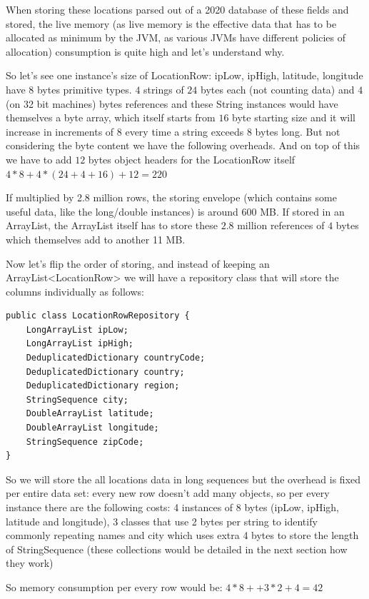 \documentclass[a4paper,twoside]{article}
\begin{document}
When storing these locations parsed out of a 2020 database of these fields and stored, the live memory (as live memory is the effective data that has to be allocated as minimum by the JVM, as various JVMs have different policies of allocation) consumption is quite high and let's understand why.

So let's see one instance's size of LocationRow: ipLow, ipHigh, latitude, longitude have $8$ bytes primitive types. $4$ strings of $24$ bytes each (not counting data) and $4$ (on 32 bit machines) bytes references and these String instances would have themselves a byte array, which itself starts from $16$ byte starting size and it will increase in increments of 8 every time a string exceeds 8 bytes long. But not considering the byte content we have the following overheads. And on top of this we have to add $12$ bytes object headers for the LocationRow itself
$ 4 * 8 + 4 * (24 + 4 + 16) + 12 = 220$

If multiplied by 2.8 million rows, the storing envelope (which contains some useful data, like the long/double instances) is around 600 MB. If stored in an ArrayList, the ArrayList itself has to store these $2.8$ million references of $4$ bytes which themselves add to another 11 MB.

Now let's flip the order of storing, and instead of keeping an ArrayList<LocationRow> we will have a repository class that will store the columns individually as follows:

\begin{small}
	\begin{verbatim}
public class LocationRowRepository {
    LongArrayList ipLow;
	LongArrayList ipHigh;
	DeduplicatedDictionary countryCode;
	DeduplicatedDictionary country;
	DeduplicatedDictionary region;
	StringSequence city;
	DoubleArrayList latitude;
	DoubleArrayList longitude;
	StringSequence zipCode;
}
\end{verbatim}
\end{small}

So we will store the all locations data in long sequences but the overhead is fixed per entire data set: every new row doesn't add many objects, so per every instance there are the following costs:
4 instances of 8 bytes (ipLow, ipHigh, latitude and longitude), 3 classes that use 2 bytes per string to identify commonly repeating names and city which uses extra 4 bytes to store the length of StringSequence (these collections would be detailed in the next section how they work)

So memory consumption per every row would be:
$4 * 8 +  + 3 * 2 + 4 = 42$
\end{document}
